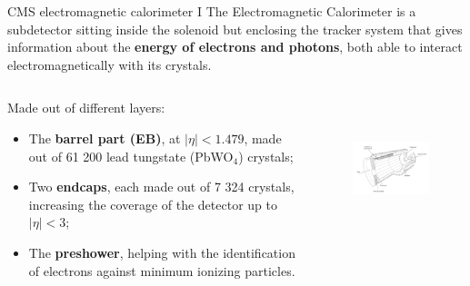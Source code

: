 \documentclass[8pt]{beamer}
\begin{document}
\begin{frame}{CMS electromagnetic calorimeter I}
\justifying
\vspace{5pt}
The \alert{Electromagnetic Calorimeter} is a subdetector sitting inside the solenoid but enclosing the tracker system that gives information about the \textbf{energy of electrons and photons}, both able to interact electromagnetically with its crystals. \vfill

\begin{columns}
	\begin{column}{0.45 \textwidth}
	Made out of different layers:
	\begin{itemize}
	\justifying
	\item The \textbf{barrel part (EB)}, at $|\eta| < 1.479$, made out of 61 200 lead tungstate (PbWO$_4$) crystals;
	\item Two \textbf{endcaps}, each made out of 7 324 crystals, increasing the coverage of the detector up to $|\eta| < 3$;
	\item The \textbf{preshower}, helping with the identification of electrons
against minimum ionizing particles.
	\end{itemize}
	\end{column}
	\begin{column}{0.55 \textwidth}
	\begin{figure}[htbp]
\begin{center}
\includegraphics[width=6.6cm, height=4cm]{figs/CMSEcal.png}
\end{center}
\end{figure}
	\end{column}
\end{columns} \vfill

\end{frame}
\end{document}
